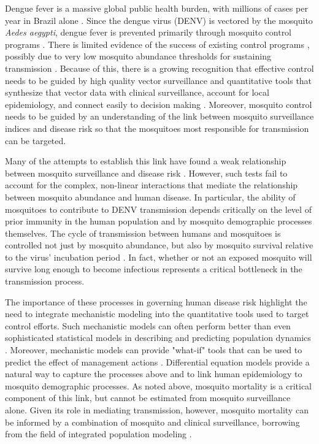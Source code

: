 \documentclass[10pt,letterpaper]{article}
\begin{document}
Dengue fever is a massive global public health burden, with millions of cases per year in Brazil alone \cite{Bhatt2013}.  
Since the dengue virus (DENV) is vectored by the mosquito \textit{Aedes aegypti}, dengue fever is prevented primarily through mosquito control programs \cite{Achee2015}.
There is limited evidence of the success of existing control programs \cite{Esu2010}, possibly due to very low mosquito abundance thresholds for sustaining transmission \cite{Scott2010a}.
Because of this, there is a growing recognition that effective control needs to be guided by high quality vector surveillance and quantitative tools that synthesize that vector data with clinical surveillance, account for local epidemiology, and connect easily to decision making \cite{Morrison2008}.
Moreover, mosquito control needs to be guided by an understanding of the link between mosquito surveillance indices and disease risk so that the mosquitoes most responsible for transmission can be targeted.

Many of the attempts to establish this link have found a weak relationship between mosquito surveillance and disease risk \cite{Bowman2014, Pepin2015, Cromwell2017}.
However, such tests fail to account for the complex, non-linear interactions that mediate the relationship between mosquito abundance and human disease.
In particular, the ability of mosquitoes to contribute to DENV transmission depends critically on the level of prior immunity in the human population \cite{Scott2010a} and by mosquito demographic processes themselves.
The cycle of transmission between humans and mosquitoes is controlled not just by mosquito abundance, but also by mosquito survival relative to the virus' incubation period \cite{Achee2015}.
In fact, whether or not an exposed mosquito will survive long enough to become infectious represents a critical bottleneck in the transmission process.

The importance of these processes in governing human disease risk highlight the need to integrate mechanistic modeling into the quantitative tools used to target control efforts.
Such mechanistic models can often perform better than even sophisticated statistical models in describing and predicting population dynamics \cite{Reilly2005}.
Moreover, mechanistic models can provide "what-if" tools that can be used to predict the effect of management actions \cite{Buckland2007}.
Differential equation models provide a natural way to capture the processes above and to link human epidemiology to mosquito demographic processes.
As noted above, mosquito mortality is a critical component of this link, but cannot be estimated from mosquito surveillance alone.
Given its role in mediating transmission, however, mosquito mortality can be informed by a combination of mosquito and clinical surveillance, borrowing from the field of integrated population modeling \cite{Schaub2010}.
\end{document}
